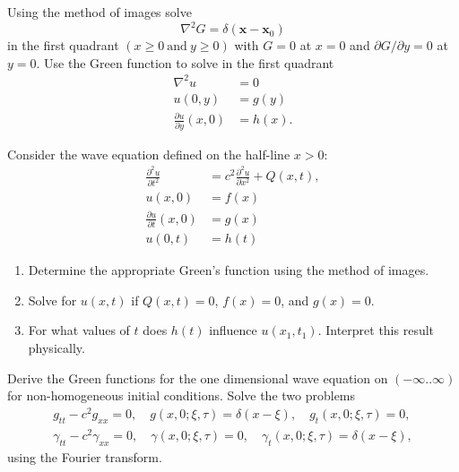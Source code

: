{%
\begin{Exercise}
  Using the method of images solve
  \[
  \nabla^2 G = \delta (\mathbf{x} - \mathbf{x}_0)
  \]
  in the first quadrant  $(x \geq 0\ \mathrm{and}\ y \geq 0)$ 
  with $G=0$ at $x = 0$
  and $\partial G / \partial y = 0$ at $y = 0$. Use the Green function
  to solve in the first quadrant
  \begin{align*}
    \nabla^2 u & = 0 \\
    u(0,y) & =  g(y) \\
    \frac{\partial u}{\partial y}(x,0) &= h(x).
  \end{align*}
\end{Exercise}








\begin{Exercise}
  Consider the wave equation defined on the half-line $x>0$:
  \begin{align*}
    \frac{\partial^2 u}{\partial t^2} &= c^2 \frac{\partial^2 u}{\partial x^2} + Q(x,t), \\
    u(x,0) &= f(x) \\
    \frac{\partial u}{\partial t} (x,0) &= g(x)  \\
    u(0,t) &= h(t)
  \end{align*}
  \begin{enumerate}
    \renewcommand{\labelenumi}{(\alph{enumi})}
  \item Determine the appropriate Green's function using the method of images.
  \item Solve for $u(x,t)$ if $Q(x,t) = 0$, $f(x) = 0$, and $g(x) = 0$.
  \item For what values of $t$ does $h(t)$ influence $u(x_1, t_1)$. 
    Interpret this result physically.
  \end{enumerate}
\end{Exercise}






\begin{Exercise}
  \label{wave_eqn_IC_green_fcn}
  Derive the Green functions for the one dimensional wave equation on 
  $(-\infty..\infty)$ for non-homogeneous initial conditions. 
  Solve the two problems
  \begin{gather*}
    g_{t t} - c^2 g_{x x} = 0, \quad
    g(x,0;\xi,\tau) = \delta(x - \xi), \quad 
    g_t(x,0;\xi,\tau) = 0, \\
    \gamma_{t t} - c^2 \gamma_{x x} = 0, \quad
    \gamma(x,0;\xi,\tau) = 0, \quad 
    \gamma_t(x,0;\xi,\tau) = \delta(x - \xi),
  \end{gather*}
  using the Fourier transform.
\end{Exercise}


}
